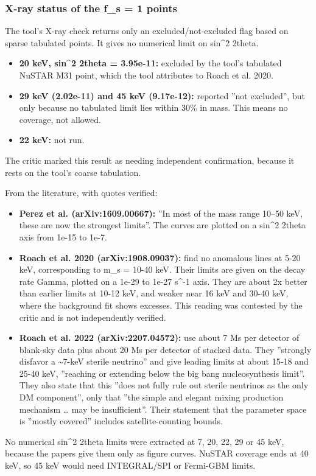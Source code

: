 \documentclass[11pt,a4paper]{article}
\begin{document}
\subsubsection{X-ray status of the f\_s = 1 points}
The tool's X-ray check returns only an excluded/not-excluded flag based on sparse tabulated points. It gives no numerical limit on sin\textasciicircum{}2 2theta.

\begin{itemize}
  \item \textbf{20 keV, sin\textasciicircum{}2 2theta = 3.95e-11:} excluded by the tool's tabulated NuSTAR M31 point, which the tool attributes to Roach et al. 2020.
  \item \textbf{29 keV (2.02e-11) and 45 keV (9.17e-12):} reported ''not excluded'', but only because no tabulated limit lies within 30\% in mass. This means no coverage, not allowed.
  \item \textbf{22 keV:} not run.
\end{itemize}
The critic marked this result as needing independent confirmation, because it rests on the tool's coarse tabulation.

From the literature, with quotes verified:

\begin{itemize}
  \item \textbf{Perez et al. (arXiv:1609.00667):} ''In most of the mass range 10--50 keV, these are now the strongest limits''. The curves are plotted on a sin\textasciicircum{}2 2theta axis from 1e-15 to 1e-7.
  \item \textbf{Roach et al. 2020 (arXiv:1908.09037):} find no anomalous lines at 5-20 keV, corresponding to m\_s = 10-40 keV. Their limits are given on the decay rate Gamma, plotted on a 1e-29 to 1e-27 s\textasciicircum{}-1 axis. They are about 2x better than earlier limits at 10-12 keV, and weaker near 16 keV and 30-40 keV, where the background fit shows excesses. This reading was contested by the critic and is not independently verified.
  \item \textbf{Roach et al. 2022 (arXiv:2207.04572):} use about 7 Ms per detector of blank-sky data plus about 20 Ms per detector of stacked data. They ''strongly disfavor a \textasciitilde{}7-keV sterile neutrino'' and give leading limits at about 15-18 and 25-40 keV, ''reaching or extending below the big bang nucleosynthesis limit''. They also state that this ''does not fully rule out sterile neutrinos as the only DM component'', only that ''the simple and elegant mixing production mechanism \ldots{} may be insufficient''. Their statement that the parameter space is ''mostly covered'' includes satellite-counting bounds.
\end{itemize}
No numerical sin\textasciicircum{}2 2theta limits were extracted at 7, 20, 22, 29 or 45 keV, because the papers give them only as figure curves. NuSTAR coverage ends at 40 keV, so 45 keV would need INTEGRAL/SPI or Fermi-GBM limits.
\end{document}
